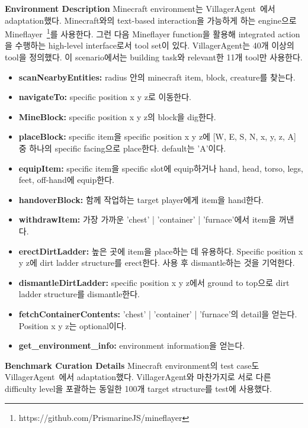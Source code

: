 \textbf{Environment Description}
Minecraft environment는 VillagerAgent~\cite{dong2024villageragentgraphbasedmultiagentframework}에서 adaptation했다. Minecraft와의 text-based interaction을 가능하게 하는 engine으로 Mineflayer~\footnote{https://github.com/PrismarineJS/mineflayer}를 사용한다. 그런 다음 Mineflayer function을 활용해 integrated action을 수행하는 high-level interface로서 tool set이 있다. VillagerAgent는 40개 이상의 tool을 정의했다. 이 scenario에서는 building task와 relevant한 11개 tool만 사용한다.
\begin{itemize}
    \item \textbf{scanNearbyEntities:} radius 안의 minecraft item, block, creature를 찾는다.
    \item \textbf{navigateTo:} specific position x y z로 이동한다.
    \item \textbf{MineBlock:} specific position x y z의 block을 dig한다.
    \item \textbf{placeBlock:} specific item을 specific position x y z에 [W, E, S, N, x, y, z, A] 중 하나의 specific facing으로 place한다. default는 'A'이다.
    \item \textbf{equipItem:} specific item을 specific slot에 equip하거나 hand, head, torso, legs, feet, off-hand에 equip한다.
    \item \textbf{handoverBlock:} 함께 작업하는 target player에게 item을 hand한다.
    \item \textbf{withdrawItem:} 가장 가까운 'chest' | 'container' | 'furnace'에서 item을 꺼낸다.
    \item \textbf{erectDirtLadder:} 높은 곳에 item을 place하는 데 유용하다. Specific position x y z에 dirt ladder structure를 erect한다. 사용 후 dismantle하는 것을 기억한다.
    \item \textbf{dismantleDirtLadder:} specific position x y z에서 ground to top으로 dirt ladder structure를 dismantle한다.
    \item \textbf{fetchContainerContents:} 'chest' | 'container' | 'furnace'의 detail을 얻는다. Position x y z는 optional이다.
    \item \textbf{get\_environment\_info:} environment information을 얻는다.
\end{itemize}

\textbf{Benchmark Curation Details}
Minecraft environment의 test case도 VillagerAgent~\cite{dong2024villageragentgraphbasedmultiagentframework}에서 adaptation했다. VillagerAgent와 마찬가지로 서로 다른 difficulty level을 포괄하는 동일한 100개 target structure를 test에 사용했다.

